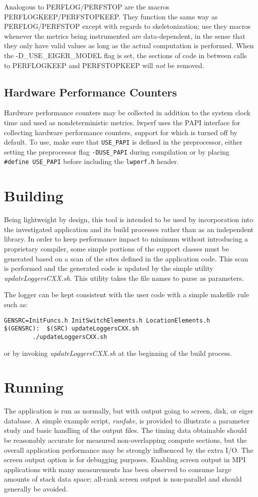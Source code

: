 \documentclass{article}
\begin{document}
Analogous to PERFLOG/PERFSTOP are the macros PERFLOGKEEP/PERFSTOPKEEP. They function the same way as PERFLOG/PERFSTOP except with regards to skeletonization; use they macros whenever the metrics being instrumented are data-dependent, in the sense that they only have valid values as long as the actual computation is performed. When the -D\_USE\_EIGER\_MODEL flag is set, the sections of code in between calls to PERFLOGKEEP and PERFSTOPKEEP will \textit{not} be removed.

\subsection{Hardware Performance Counters}
Hardware performance counters may be collected in addition to the system clock time and used as nondeterministic metrics. lwperf uses the PAPI interface for collecting hardware performance counters, support for which is turned off by default. To use, make sure that \texttt{USE\_PAPI} is defined in the preprocessor, either setting the preprocessor flag \texttt{-DUSE\_PAPI} during compilation or by placing \texttt{#define USE\_PAPI} before including the \texttt{lwperf.h} header.

\section{Building}
Being lightweight by design, this tool is intended to be used by incorporation into the investigated application and its build processes rather than as an independent library.  In order to keep performance impact to minimum without introducing a proprietary compiler, some simple portions of the support classes must be generated based on a scan of the sites defined in the application code. This scan is performed and the generated code is updated by the simple utility {\em updateLoggersCXX.sh}. This utility takes the file names to parse as parameters.

The logger can be kept consistent with the user code with a simple makefile rule such as:
\begin{verbatim}
GENSRC=InitFuncs.h InitSwitchElements.h LocationElements.h
$(GENSRC):  $(SRC) updateLoggersCXX.sh
        ./updateLoggersCXX.sh
\end{verbatim}
or by invoking {\em updateLoggersCXX.sh} at the beginning of the build process.

\section{Running}
\label{sec:running}
The application is run as normally, but with output going to screen, disk, or eiger database. A simple example script, {\em runfake}, is provided to illustrate a parameter study and basic handling of the output files.
The timing data obtainable should be reasonably accurate for measured non-overlapping compute sections, but the overall application performance may be strongly influenced by the extra I/O.
The screen output option is for debugging purposes.
Enabling screen output in MPI applications with many measurements has been observed to consume large amounts of stack data space; all-rank screen output is non-parallel and should generally be avoided. 
\end{document}
